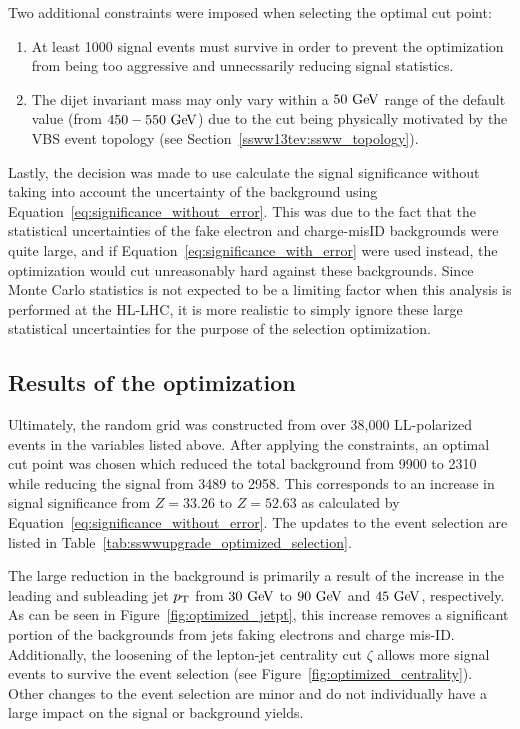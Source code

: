 Two additional constraints were imposed when selecting the optimal cut point:
\begin{enumerate}
\item At least 1000 signal events must survive in order to prevent the optimization from being too aggressive and unnecssarily reducing signal statistics.
\item The dijet invariant mass may only vary within a $50\gev$ range of the default value (from $450-550\gev$) due to the cut being physically motivated by the VBS event topology (see Section~\ref{ssww13tev:ssww_topology}).
\end{enumerate}

Lastly, the decision was made to use calculate the signal significance without taking into account the uncertainty of the background using Equation~\ref{eq:significance_without_error}.
This was due to the fact that the statistical uncertainties of the fake electron and charge-misID backgrounds were quite large, and if Equation~\ref{eq:significance_with_error} were used instead, the optimization would cut unreasonably hard against these backgrounds.
Since Monte Carlo statistics is not expected to be a limiting factor when this analysis is performed at the HL-LHC, it is more realistic to simply ignore these large statistical uncertainties for the purpose of the selection optimization.

%
\subsection{Results of the optimization}\label{sswwupgrade:opt_results}
Ultimately, the random grid was constructed from over 38,000 LL-polarized \ssww events in the variables listed above.
After applying the constraints, an optimal cut point was chosen which reduced the total background from 9900 to 2310 while reducing the signal from 3489 to 2958.
This corresponds to an increase in signal significance from $Z = 33.26$ to $Z = 52.63$ as calculated by Equation~\ref{eq:significance_without_error}.
The updates to the event selection are listed in Table~\ref{tab:sswwupgrade_optimized_selection}. %

The large reduction in the background is primarily a result of the increase in the leading and subleading jet $p_{\mathrm{T}}$ from $30\gev$ to $90\gev$ and $45\gev$, respectively.
As can be seen in Figure~\ref{fig:optimized_jetpt}, this increase removes a significant portion of the backgrounds from jets faking electrons and charge mis-ID.
Additionally, the loosening of the lepton-jet centrality cut $\zeta$ allows more signal events to survive the event selection (see Figure~\ref{fig:optimized_centrality}).
Other changes to the event selection are minor and do not individually have a large impact on the signal or background yields.

